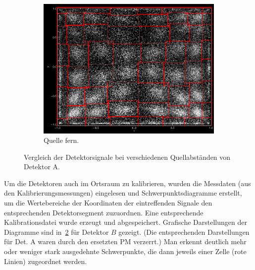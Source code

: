 \documentclass[slug=PET, room=Andreas-Schubert-Bau\,\ 424A,
supervisor=Carsten\ Bittrich, coursedate=10.\ 01.\ 2020, ngerman]{../../Lab_Report_LaTeX/lab_report}
\begin{document}
\begin{figure}[h!]
\begin{subfigure}{0.32\textwidth}
    \includegraphics[width=.9\textwidth]{../messungen/kalib/vergleich_mitte_fern_FERN.png}
    \caption{Quelle fern.}
    \label{fig:ab-fern}
  \end{subfigure}
  \caption{Vergleich der Detektorsignale bei verschiedenen
    Quellabständen von Detektor A.}
  \label{fig:abstand}
\end{figure}

Um die Detektoren auch im Ortsraum zu kalibrieren, wurden die Messdaten
(aus den Kalibrierungsmessungen) eingelesen und Schwerpunktsdiagramme
erstellt, um die Wertebereiche der Koordinaten der eintreffenden
Signale den entsprechenden Detektorsegment zuzuordnen. Eine
entsprechende Kalibrationsdatei wurde erzeugt und
abgespeichert. Grafische Darstellungen der Diagramme sind
in~\ref{fig:abstand} f\"ur Detektor \(B\) gezeigt. (Die entsprechenden
Darstellungen f\"ur Det. A waren durch den ersetzten PM verzerrt.)
Man erkennt deutlich mehr oder weniger stark ausgedehnte
Schwerpunkte, die dann jeweils einer Zelle (rote Linien) zugeordnet
werden.
\end{document}
